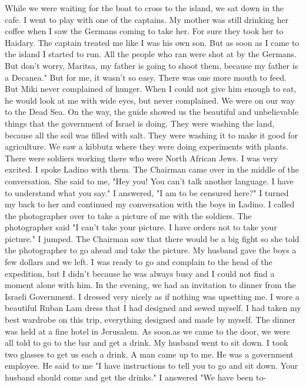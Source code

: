 While we were waiting 
for the boat to cross to the island, we sat down in the cafe.
I went 
to play with one of the captains.
My mother was still drinking her 
coffee when I saw the Germans coming to take her.
For sure they took 
her to Haidary.
The captain treated me like I was his own son.
But as 
soon as I came to the island I started to run.
All the people who 
ran were shot at by the Germans.
But don’t worry, Maritsa, my father 
is going to shoot them, because my father is a Decanea."
But for me, 
it wasn't so easy.
There was one more mouth to feed.
But Miki never 
complained of hunger.
When I could not give him enough to eat, he 
would look at me with wide eyes, but never complained.
We were on our way to the Dead Sea.
On the way, the guide showed 
us the beautiful and unbelievable things that the government of Israel is doing.
They were washing the land, because all the soil was filled 
with salt.
They were washing it to make it good for agriculture.
We 
saw a kibbutz where they were doing experiments with plants.
There 
were soldiers working there who were North African Jews.
I was very 
excited.
I spoke Ladino with them.
The Chairman came over in the middle 
of the conversation.
She said to me, "Hey you!
You can't talk another 
language.
I have to understand what you say."
I answered, "I am to 
be censured here?"
I turned my back to her and continued my conversation 
with the boys in Ladino.
I called the photographer over to take a 
picture of me with the soldiers.
The photographer said "I 
can't take your picture.
I have orders not to take your picture."
I jumped.
The Chairman saw that there would be a big fight so she told 
the photographer to go ahead and take the picture.
My husband gave the 
boys a few dollars and we left.
I was ready to go and complain to the 
head of the expedition, but I didn't because he was always busy and 
I could not find a moment alone with him.
In the evening, we had an invitation to dinner from the Israeli 
Government.
I dressed very nicely as if nothing was upsetting me.
I 
wore a beautiful Ruban Lam dress that I had designed and sewed myself.
I had taken my best wardrobe on this trip, everything designed 
and made by myself.
The dinner was held at a fine hotel in Jerusalem.
As soon.as we came to the door, we were all told to go to the bar and 
get a drink.
My husband went to sit down.
I took two glasses to get 
us each a drink.
A man came up to me.
He was a government employee.
He said to me "I have instructions to tell you to go and sit down.
Your 
husband should come and get the drinks."
I answered "We have been to-
